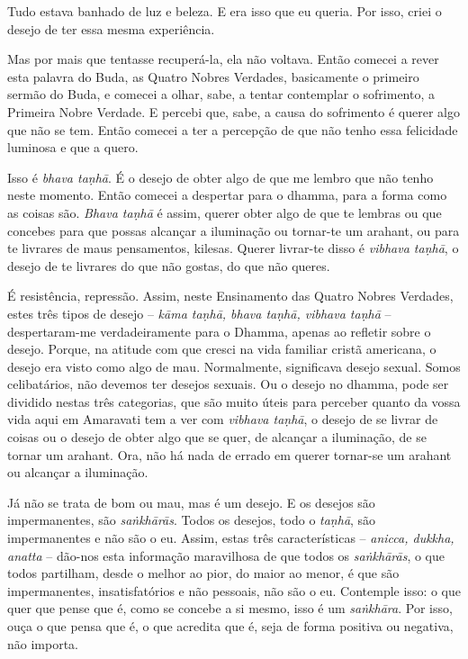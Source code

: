 Tudo estava banhado de luz e beleza. E era isso que eu queria. Por isso, criei o
desejo de ter essa mesma experiência.

Mas por mais que tentasse recuperá-la, ela não voltava. Então comecei a rever
esta palavra do Buda, as Quatro Nobres Verdades, basicamente o primeiro sermão
do Buda, e comecei a olhar, sabe, a tentar contemplar o sofrimento, a Primeira
Nobre Verdade. E percebi que, sabe, a causa do sofrimento é querer algo que não
se tem. Então comecei a ter a percepção de que não tenho essa felicidade
luminosa e que a quero.

Isso é \emph{bhava taṇhā}. É o desejo de obter algo de que me lembro que não tenho
neste momento. Então comecei a despertar para o dhamma, para a forma como as
coisas são. \emph{Bhava taṇhā} é assim, querer obter algo de que te lembras ou que
concebes para que possas alcançar a iluminação ou tornar-te um arahant, ou para
te livrares de maus pensamentos, kilesas. Querer livrar-te disso é \emph{vibhava
taṇhā}, o desejo de te livrares do que não gostas, do que não queres.

É resistência, repressão. Assim, neste Ensinamento das Quatro Nobres Verdades,
estes três tipos de desejo -- \emph{kāma taṇhā, bhava taṇhā, vibhava taṇhā} --
despertaram-me verdadeiramente para o Dhamma, apenas ao refletir sobre o
desejo. Porque, na atitude com que cresci na vida familiar cristã americana, o
desejo era visto como algo de mau. Normalmente, significava desejo sexual. Somos
celibatários, não devemos ter desejos sexuais. Ou o desejo no dhamma, pode ser
dividido nestas três categorias, que são muito úteis para perceber quanto da
vossa vida aqui em Amaravati tem a ver com \emph{vibhava taṇhā}, o desejo de se livrar
de coisas ou o desejo de obter algo que se quer, de alcançar a iluminação, de se
tornar um arahant. Ora, não há nada de errado em querer tornar-se um arahant ou
alcançar a iluminação.

Já não se trata de bom ou mau, mas é um desejo. E os desejos são impermanentes,
são \emph{saṅkhārās}. Todos os desejos, todo o \emph{taṇhā}, são impermanentes e não são o eu.
Assim, estas três características -- \emph{anicca, dukkha, anatta} -- dão-nos esta
informação maravilhosa de que todos os \emph{saṅkhārās}, o que todos partilham, desde o
melhor ao pior, do maior ao menor, é que são impermanentes, insatisfatórios e
não pessoais, não são o eu. Contemple isso: o que quer que pense que é, como se
concebe a si mesmo, isso é um \emph{saṅkhāra}. Por isso, ouça o que pensa que é, o que
acredita que é, seja de forma positiva ou negativa, não importa.

